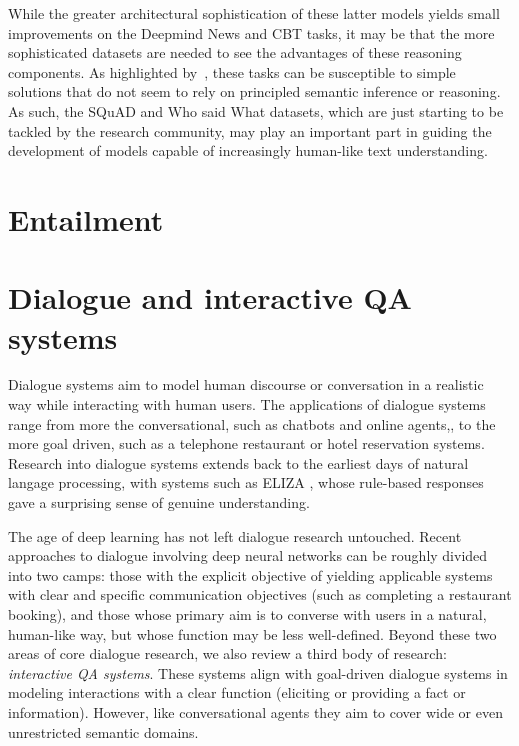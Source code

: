 \documentclass[11pt,letterpaper]{article}
\begin{document}
While the greater architectural sophistication of these latter models yields small improvements on the Deepmind News and CBT tasks, it may be that the more sophisticated datasets are needed to see the advantages of these reasoning components. As highlighted by~, these tasks can be susceptible to simple solutions that do not seem to rely on principled semantic inference or reasoning. As such, the SQuAD and Who said What datasets, which are just starting to be tackled by the research community, may play an important part in guiding the development of models capable of increasingly human-like text understanding.

\section{Entailment}

\section{Dialogue and interactive QA systems}

Dialogue systems aim to model human discourse or conversation in a realistic way while interacting with human users. The applications of dialogue systems range from more the conversational, such as chatbots and online agents,, to the more goal driven, such as a telephone restaurant or hotel reservation systems. Research into dialogue systems extends back to the earliest days of natural langage processing, with systems such as ELIZA \cite{weizenbaum1966eliza}, whose rule-based responses gave a surprising sense of genuine understanding.     

The age of deep learning has not left dialogue research untouched. Recent approaches to dialogue involving deep neural networks can be roughly divided into two camps: those with the explicit objective of yielding applicable systems with clear and specific communication objectives (such as completing a restaurant booking), and those whose primary aim is to converse with users in a natural, human-like way, but whose function may be less well-defined. Beyond these two areas of core dialogue research, we also review a third body of research: \emph{interactive QA systems}. These systems align with goal-driven dialogue systems in modeling interactions with a clear function (eliciting or providing a fact or information). However, like conversational agents they aim to cover wide or even unrestricted semantic domains.     
\end{document}
